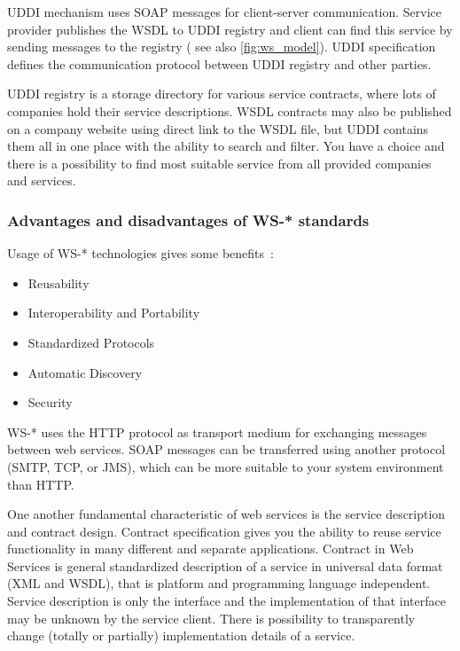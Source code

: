 UDDI mechanism uses SOAP messages for client-server communication. 
Service provider publishes the WSDL to UDDI registry and client can
find this service by sending messages to the registry ( see also 
\autoref{fig:ws_model}). UDDI specification defines the communication
protocol between UDDI registry and other parties.


UDDI registry is a storage directory for various service contracts, where
lots of companies hold their service descriptions. WSDL contracts may 
also be published on a company website using direct link to the WSDL file,
but UDDI contains them all in one place with the ability to search and
filter.
You have a choice and there is a possibility to find most suitable service
from all provided companies and services.



\subsubsection{Advantages and disadvantages of WS-* standards}
\label{sec:adv_and_disadv_of_ws_standards}
Usage of WS-* technologies gives some
benefits~\cite{ws_technologies_state_of_the_art}:

\begin{itemize}
  \item Reusability
  \item Interoperability and Portability
  \item Standardized Protocols
  \item Automatic Discovery
  \item Security
\end{itemize}

WS-* uses the HTTP protocol as transport medium for exchanging messages
between web services. SOAP messages can be transferred using another
protocol (\gls{SMTP}, TCP, or \gls{JMS}), which can be more suitable to
your system environment than HTTP.

One another fundamental characteristic of web services is the service
description and contract design. Contract specification gives you the ability to
reuse service functionality in many different and separate applications.
Contract in Web Services is general standardized description of a service in
universal data format (XML and WSDL), that is platform and programming language
independent. Service description is only the interface and the implementation
of that interface may be unknown by the service client. There is possibility to
transparently change (totally or partially) implementation details of a service.


